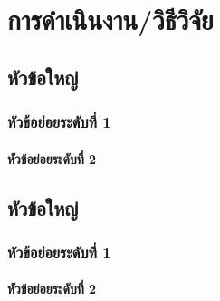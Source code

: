 \chapter{การดําเนินงาน/วิธีวิจัย}
\label{chapter3}

\section{หัวข้อใหญ่}

\subsection{หัวข้อย่อยระดับที่ 1}

\subsubsection{หัวข้อย่อยระดับที่ 2}

\section{หัวข้อใหญ่}

\subsection{หัวข้อย่อยระดับที่ 1}

\subsubsection{หัวข้อย่อยระดับที่ 2}


